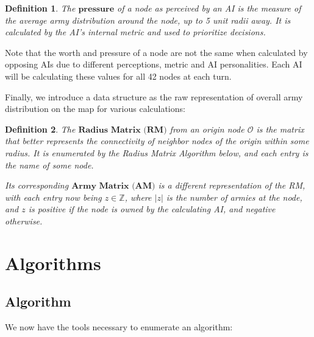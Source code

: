 \documentclass[12pt]{article}  %
\newtheorem{definition}{Definition}
\begin{document}
\begin{definition}
The $\textbf{pressure}$ of a node as perceived by an AI is the measure of the average army distribution around the node, up to 5 unit radii away. It is calculated by the AI's internal metric and used to prioritize decisions.
\end{definition}

Note that the worth and pressure of a node are not the same when calculated by opposing AIs due to different perceptions, metric and AI personalities. Each AI will be calculating these values for all 42 nodes at each turn.

Finally, we introduce a data structure as the raw representation of overall army distribution on the map for various calculations:

\begin{definition}
The $\textbf{Radius Matrix (RM)}$ from an origin node $\mathcal{O}$ is the matrix that better represents the connectivity of neighbor nodes of the origin within some radius. It is enumerated by the Radius Matrix Algorithm below, and each entry is the name of some node.

Its corresponding $\textbf{Army Matrix (AM)}$ is a different representation of the RM, with each entry now being $z \in \mathbb{Z}$, where $|z|$ is the number of armies at the node, and $z$ is positive if the node is owned by the calculating AI, and negative otherwise.
\end{definition}







\section{Algorithms}




\subsection{Algorithm}

We now have the tools necessary to enumerate an algorithm:
\end{document}
